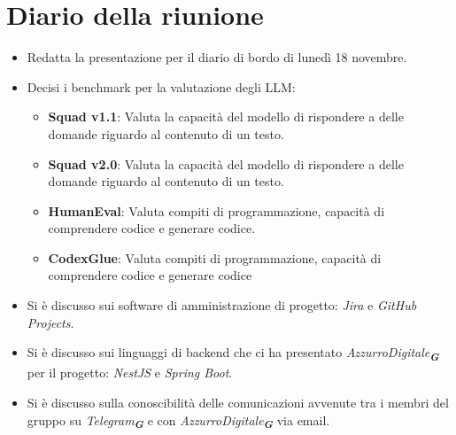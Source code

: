 
\section{Diario della riunione}

\begin{itemize}
    \item Redatta la presentazione per il diario di bordo di lunedì 18 novembre.
    \item Decisi i benchmark per la valutazione degli LLM:
    \begin{itemize}
        \item \textbf{Squad v1.1}: Valuta la capacità del modello di rispondere a delle domande riguardo al contenuto di un testo.
        \item \textbf{Squad v2.0}: Valuta la capacità del modello di rispondere a delle domande riguardo al contenuto di un testo.
        \item \textbf{HumanEval}: Valuta compiti di programmazione, capacità di comprendere codice e generare codice.
        \item \textbf{CodexGlue}: Valuta compiti di programmazione, capacità di comprendere codice e generare codice
    \end{itemize}
    \item Si è discusso sui software di amministrazione di progetto: \emph{Jira} e \emph{GitHub Projects}.
    \item Si è discusso sui linguaggi di backend che ci ha presentato \emph{AzzurroDigitale}\textsubscript{\textit{\textbf{G}}} per il progetto:
    \emph{NestJS} e \emph{Spring Boot}.
    \item Si è discusso sulla conoscibilità delle comunicazioni avvenute tra i membri del gruppo su \emph{Telegram}\textsubscript{\textit{\textbf{G}}} e con 
    \emph{AzzurroDigitale}\textsubscript{\textit{\textbf{G}}} via email.
\end{itemize}